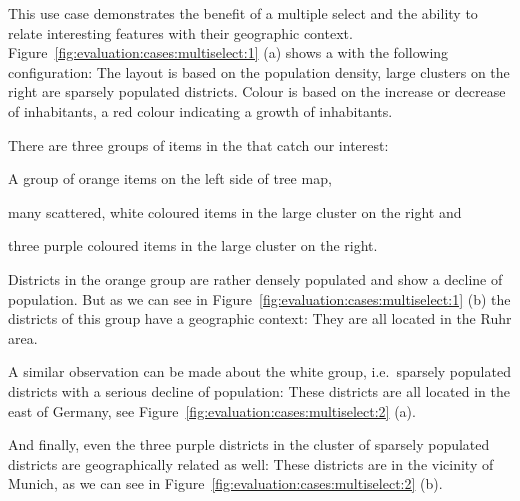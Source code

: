 This use case demonstrates the benefit of a multiple select and the ability to relate interesting features with their geographic context.
Figure~\ref{fig:evaluation:cases:multiselect:1} (a) shows a \tmap{} with the following configuration:
The layout is based on the population density, large clusters on the right are sparsely populated districts.
Colour is based on the increase or decrease of inhabitants, a red colour indicating a growth of inhabitants.

There are three groups of items in the \tmap{} that catch our interest:
\begin{enumerate*}[label=(\arabic*)]
  \item A group of orange items on the left side of tree map,
  \item many scattered, white coloured items in the large cluster on the right and
  \item three purple coloured items in the large cluster on the right.
\end{enumerate*}

Districts in the orange group are rather densely populated and show a decline of population.
But as we can see in Figure~\ref{fig:evaluation:cases:multiselect:1} (b) the districts of this group have a geographic context:
They are all located in the Ruhr area.

A similar observation can be made about the white group, i.e.\ sparsely populated districts with a serious decline of population:
These districts are all located in the east of Germany, see Figure~\ref{fig:evaluation:cases:multiselect:2} (a).

And finally, even the three purple districts in the cluster of sparsely populated districts are geographically related as well:
These districts are in the vicinity of Munich, as we can see in Figure~\ref{fig:evaluation:cases:multiselect:2} (b).


